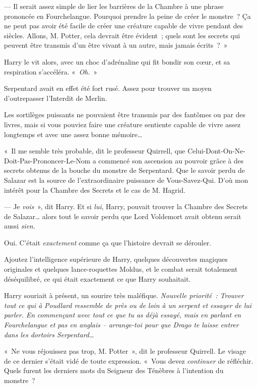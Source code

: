 --- Il serait assez simple de lier les barrières de la Chambre à une phrase prononcée en Fourchelangue. Pourquoi prendre la peine de créer le monstre~? Ça ne peut pas avoir été facile de créer une créature capable de vivre pendant des siècles. Allons, M. Potter, cela devrait être évident~; quels sont les secrets qui peuvent être transmis d'un être vivant à un autre, mais jamais écrits~?~»

Harry le vit alors, avec un choc d'adrénaline qui fit bondir son cœur, et sa respiration s'accéléra. «~\emph{Oh.}~»

Serpentard avait en effet été fort rusé. Assez pour trouver un moyen d'outrepasser l'Interdit de Merlin.

Les sortilèges puissants ne pouvaient être transmis par des fantômes ou par des livres, mais si vous pouviez faire une créature sentiente capable de vivre assez longtemps et avec une assez bonne mémoire…

«~Il me semble très probable, dit le professeur Quirrell, que Celui-Dont-On-Ne-Doit-Pas-Prononcer-Le-Nom a commencé son ascension au pouvoir grâce à des secrets obtenus de la bouche du monstre de Serpentard. Que le savoir perdu de Salazar est la source de l'extraordinaire puissance de Vous-Savez-Qui. D'où mon intérêt pour la Chambre des Secrets et le cas de M. Hagrid.

--- Je \emph{vois}~», dit Harry. Et si \emph{lui}, Harry, pouvait trouver la Chambre des Secrets de Salazar… alors tout le savoir perdu que Lord Voldemort avait obtenu serait aussi \emph{sien}.

Oui. C'était \emph{exactement} comme ça que l'histoire devrait se dérouler.

Ajoutez l'intelligence supérieure de Harry, quelques découvertes magiques originales et quelques lance-roquettes Moldus, et le combat serait totalement déséquilibré, ce qui était exactement ce que Harry souhaitait.

Harry souriait à présent, un sourire très maléfique. \emph{Nouvelle priorité~: Trouver tout ce qui à Poudlard ressemble de près ou de loin à un serpent et essayer de lui parler. En commençant avec tout ce que tu as déjà essayé, mais en parlant en Fourchelangue et pas en anglais -- arrange-toi pour que Drago te laisse entrer dans les dortoirs Serpentard…}

«~Ne vous réjouissez pas trop, M. Potter~», dit le professeur Quirrell. Le visage de ce dernier s'était vidé de toute expression. «~Vous devez \emph{continuer} de réfléchir. Quels furent les derniers mots du Seigneur des Ténèbres à l'intention du monstre~?

